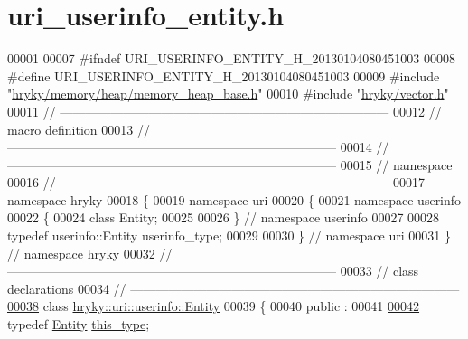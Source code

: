 \hypertarget{uri__userinfo__entity_8h_source}{\section{uri\-\_\-userinfo\-\_\-entity.\-h}
}

\begin{DoxyCode}
00001 
00007 \textcolor{preprocessor}{#ifndef URI\_USERINFO\_ENTITY\_H\_20130104080451003}
00008 \textcolor{preprocessor}{}\textcolor{preprocessor}{#define URI\_USERINFO\_ENTITY\_H\_20130104080451003}
00009 \textcolor{preprocessor}{}\textcolor{preprocessor}{#include "\hyperlink{memory__heap__base_8h}{hryky/memory/heap/memory_heap_base.h}"}
00010 \textcolor{preprocessor}{#include "\hyperlink{vector_8h}{hryky/vector.h}"}
00011 \textcolor{comment}{//
      ------------------------------------------------------------------------------}
00012 \textcolor{comment}{// macro definition}
00013 \textcolor{comment}{//
      ------------------------------------------------------------------------------}
00014 \textcolor{comment}{//
      ------------------------------------------------------------------------------}
00015 \textcolor{comment}{// namespace}
00016 \textcolor{comment}{//
      ------------------------------------------------------------------------------}
00017 \textcolor{keyword}{namespace }hryky
00018 \{
00019 \textcolor{keyword}{namespace }uri
00020 \{
00021 \textcolor{keyword}{namespace }userinfo
00022 \{
00024     \textcolor{keyword}{class }Entity;
00025 
00026 \} \textcolor{comment}{// namespace userinfo}
00027 
00028 \textcolor{keyword}{typedef} userinfo::Entity userinfo\_type;
00029 
00030 \} \textcolor{comment}{// namespace uri}
00031 \} \textcolor{comment}{// namespace hryky}
00032 \textcolor{comment}{//
      ------------------------------------------------------------------------------}
00033 \textcolor{comment}{// class declarations}
00034 \textcolor{comment}{//
      ------------------------------------------------------------------------------}
\hypertarget{uri__userinfo__entity_8h_source_l00038}{}\hyperlink{classhryky_1_1uri_1_1userinfo_1_1_entity}{00038} \textcolor{comment}{}\textcolor{keyword}{class }\hyperlink{classhryky_1_1uri_1_1userinfo_1_1_entity}{hryky::uri::userinfo::Entity}
00039 \{
00040 \textcolor{keyword}{public} :
00041 
\hypertarget{uri__userinfo__entity_8h_source_l00042}{}\hyperlink{classhryky_1_1uri_1_1userinfo_1_1_entity_ac4680728d50e274ba5073c9d25c42c06}{00042}     \textcolor{keyword}{typedef} \hyperlink{classhryky_1_1uri_1_1userinfo_1_1_entity}{Entity} \hyperlink{classhryky_1_1uri_1_1userinfo_1_1_entity_ac4680728d50e274ba5073c9d25c42c06}{this_type};

\end{DoxyCode}

